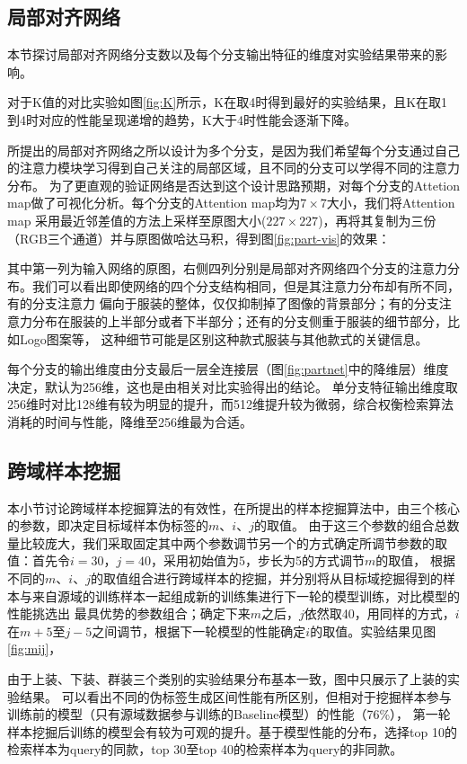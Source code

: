 \subsection{局部对齐网络}
本节探讨局部对齐网络分支数以及每个分支输出特征的维度对实验结果带来的影响。

对于K值的对比实验如图\ref{fig:K}所示，K在取4时得到最好的实验结果，且K在取1到4时对应的性能呈现递增的趋势，K大于4时性能会逐渐下降。

所提出的局部对齐网络之所以设计为多个分支，是因为我们希望每个分支通过自己的注意力模块学习得到自己关注的局部区域，且不同的分支可以学得不同的注意力分布。
为了更直观的验证网络是否达到这个设计思路预期，对每个分支的Attetion map做了可视化分析。每个分支的Attention map均为$7 \times 7$大小，我们将Attention map
采用最近邻差值的方法上采样至原图大小($227 \times 227$)，再将其复制为三份（RGB三个通道）并与原图做哈达马积，得到图\ref{fig:part-vis}的效果：

其中第一列为输入网络的原图，右侧四列分别是局部对齐网络四个分支的注意力分布。我们可以看出即使网络的四个分支结构相同，但是其注意力分布却有所不同，有的分支注意力
偏向于服装的整体，仅仅抑制掉了图像的背景部分；有的分支注意力分布在服装的上半部分或者下半部分；还有的分支侧重于服装的细节部分，比如Logo图案等，
这种细节可能是区别这种款式服装与其他款式的关键信息。


每个分支的输出维度由分支最后一层全连接层（图\ref{fig:partnet}中的降维层）维度决定，默认为256维，这也是由相关对比实验得出的结论。
单分支特征输出维度取256维时对比128维有较为明显的提升，而512维提升较为微弱，综合权衡检索算法消耗的时间与性能，降维至256维最为合适。
\subsection{跨域样本挖掘}
本小节讨论跨域样本挖掘算法的有效性，在所提出的样本挖掘算法中，由三个核心的参数，即决定目标域样本伪标签的$m$、$i$、$j$的取值。
由于这三个参数的组合总数量比较庞大，我们采取固定其中两个参数调节另一个的方式确定所调节参数的取值：首先令$i=30$，$j=40$，采用初始值为5，步长为5的方式调节$m$的取值，
根据不同的$m$、$i$、$j$的取值组合进行跨域样本的挖掘，并分别将从目标域挖掘得到的样本与来自源域的训练样本一起组成新的训练集进行下一轮的模型训练，对比模型的性能挑选出
最具优势的参数组合；确定下来$m$之后，$j$依然取40，用同样的方式，$i$在$m+5$至$j-5$之间调节，根据下一轮模型的性能确定$i$的取值。实验结果见图\ref{fig:mij}，


由于上装、下装、群装三个类别的实验结果分布基本一致，图中只展示了上装的实验结果。
可以看出不同的伪标签生成区间性能有所区别，但相对于挖掘样本参与训练前的模型（只有源域数据参与训练的Baseline模型）的性能（76\%），
第一轮样本挖掘后训练的模型会有较为可观的提升。基于模型性能的分布，选择top 10的检索样本为query的同款，top 30至top 40的检索样本为query的非同款。

